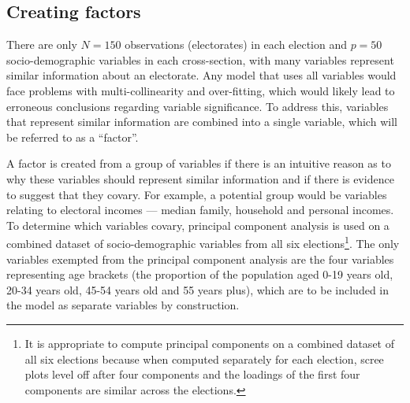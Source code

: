 \documentclass[times, doublespace]{anzsauth}
\let\rmarkdownfootnote\footnote%
\def\footnote{\protect\rmarkdownfootnote}
\begin{document}
\hypertarget{creating-factors}{%
\subsection{Creating factors}\label{creating-factors}}

There are only \(N = 150\) observations (electorates) in each election and \(p = 50\) socio-demographic variables in each cross-section, with many variables represent similar information about an electorate. Any model that uses all variables would face problems with multi-collinearity and over-fitting, which would likely lead to erroneous conclusions regarding variable significance. To address this, variables that represent similar information are combined into a single variable, which will be referred to as a ``factor''.

A factor is created from a group of variables if there is an intuitive reason as to why these variables should represent similar information and if there is evidence to suggest that they covary. For example, a potential group would be variables relating to electoral incomes --- median family, household and personal incomes. To determine which variables covary, principal component analysis is used on a combined dataset of socio-demographic variables from all six elections\footnote{It is appropriate to compute principal components on a combined dataset of all six elections because when computed separately for each election, scree plots level off after four components and the loadings of the first four components are similar across the elections.}. The only variables exempted from the principal component analysis are the four variables representing age brackets (the proportion of the population aged 0-19 years old, 20-34 years old, 45-54 years old and 55 years plus), which are to be included in the model as separate variables by construction.
\end{document}
